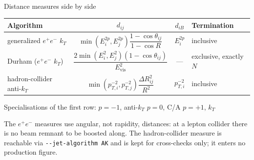 \documentclass[aspectratio=169,10pt]{beamer}
\newcommand{\ee}{$e^{+}e^{-}$}
\newcommand{\dij}{d_{ij}}
\newcommand{\diB}{d_{iB}}
\newcommand{\Cdur}[1]{\textcolor{pfblue}{#1}}
\newcommand{\Cca}[1]{\textcolor{caviolet}{#1}}
\newcommand{\Ckt}[1]{\textcolor{ktamberink}{#1}}
\newcommand{\Cakt}[1]{\textcolor{aktteal}{#1}}
\begin{document}
\begin{frame}{Distance measures side by side}

  \begin{center}
  \renewcommand{\arraystretch}{2.0}
  \small
  \begin{tabular}{@{}lccl@{}}
    \toprule
    Algorithm & $\dij$ & $\diB$ & Termination \\
    \midrule
    generalized \ee{} $k_T$
      & $\min\!\left(E_i^{2p}, E_j^{2p}\right)\dfrac{1-\cos\theta_{ij}}{1-\cos R}$
      & $E_i^{2p}$
      & inclusive \\
    \addlinespace[0.7ex]
    \Cdur{Durham} (\ee{} $k_T$)
      & $\dfrac{2\min\!\left(E_i^{2}, E_j^{2}\right)(1-\cos\theta_{ij})}{E_{\mathrm{vis}}^{2}}$
      & ---
      & exclusive, exactly $N$ \\
    \addlinespace[0.7ex]
    hadron-collider anti-$k_T$
      & $\min\!\left(p_{T,i}^{-2}, p_{T,j}^{-2}\right)\dfrac{\Delta R_{ij}^{2}}{R^{2}}$
      & $p_{T,i}^{-2}$
      & inclusive \\
    \bottomrule
  \end{tabular}

  \medskip
  {\small Specialisations of the first row:
   \Cakt{$p=-1$, anti-$k_T$} \quad
   \Cca{$p=0$, C/A} \quad
   \Ckt{$p=+1$, $k_T$}}
  \end{center}

  \smallskip
  The \ee{} measures use angular, not rapidity, distances: at a lepton collider
  there is no beam remnant to be boosted along. The hadron-collider measure is
  reachable via \texttt{-{}-jet-algorithm AK} and is kept for cross-checks
  only; it enters no production figure.
\end{frame}
\end{document}
